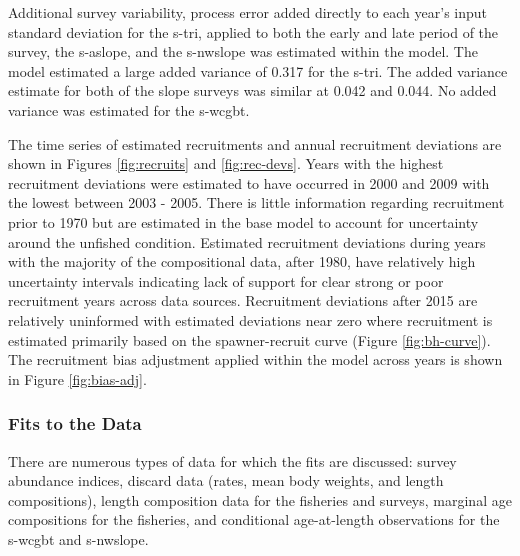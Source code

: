 \documentclass[11pt,
  english,
  a4paper,
]{article}
\begin{document}
\leavevmode\tagmcend\tagstructend\par


Additional survey variability, process error added directly to each year's input standard deviation for the \gls{s-tri}, applied to both the early and late period of the survey, the \gls{s-aslope}, and the \gls{s-nwslope} was estimated within the model. The model estimated a large added variance of 0.317 for the \gls{s-tri}. The added variance estimate for both of the slope surveys was similar at 0.042 and 0.044. No added variance was estimated for the \gls{s-wcgbt}.

\leavevmode\tagmcend\tagstructend\par


The time series of estimated recruitments and annual recruitment deviations are shown in Figures \ref{fig:recruits} and \ref{fig:rec-devs}. Years with the highest recruitment deviations were estimated to have occurred in 2000 and 2009 with the lowest between 2003 - 2005. There is little information regarding recruitment prior to 1970 but are estimated in the base model to account for uncertainty around the unfished condition. Estimated recruitment deviations during years with the majority of the compositional data, after 1980, have relatively high uncertainty intervals indicating lack of support for clear strong or poor recruitment years across data sources. Recruitment deviations after 2015 are relatively uninformed with estimated deviations near zero where recruitment is estimated primarily based on the spawner-recruit curve (Figure \ref{fig:bh-curve}). The recruitment bias adjustment applied within the model across years is shown in Figure \ref{fig:bias-adj}.

\leavevmode\tagmcend\tagstructend\par


\hypertarget{fits-to-the-data}{%
\subsubsection{Fits to the Data}\label{fits-to-the-data}}

\leavevmode\tagmcend\tagstructend


There are numerous types of data for which the fits are discussed: survey abundance indices, discard data (rates, mean body weights, and length compositions), length composition data for the fisheries and surveys, marginal age compositions for the fisheries, and conditional age-at-length observations for the \gls{s-wcgbt} and \gls{s-nwslope}.
\end{document}
